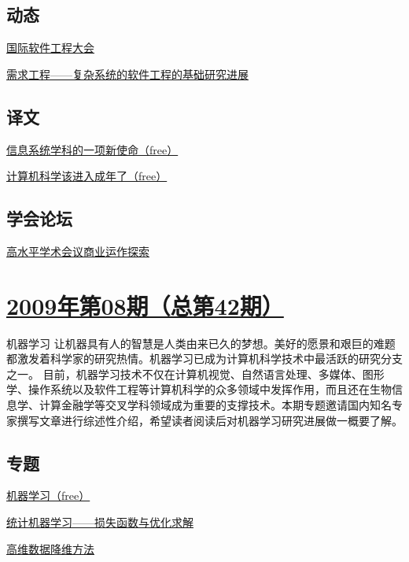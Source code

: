 \documentclass[a4paper]{article}
\begin{document}
\subsection{动态}
\href{http://history.ccf.org.cn/resources/1190201776262/2010/04/15/043068.pdf}{国际软件工程大会}

\href{http://history.ccf.org.cn/resources/1190201776262/2010/04/15/043062.pdf}{需求工程——复杂系统的软件工程的基础研究进展}

\subsection{译文}
\href{http://history.ccf.org.cn/resources/1190201776262/2010/04/15/043070.pdf}{信息系统学科的一项新使命（free）}

\href{http://history.ccf.org.cn/resources/1190201776262/2010/04/15/043073.pdf}{计算机科学该进入成年了（free）}

\subsection{学会论坛}
\href{http://history.ccf.org.cn/resources/1190201776262/2010/04/15/043092.pdf}{高水平学术会议商业运作探索}


\section{\href{http://history.ccf.org.cn/sites/ccf/jsjtbbd.jsp?contentId=2542567629043}{\textbf{2009年第08期（总第42期）}}}
机器学习 让机器具有人的智慧是人类由来已久的梦想。美好的愿景和艰巨的难题都激发着科学家的研究热情。机器学习已成为计算机科学技术中最活跃的研究分支之一。 目前，机器学习技术不仅在计算机视觉、自然语言处理、多媒体、图形学、操作系统以及软件工程等计算机科学的众多领域中发挥作用，而且还在生物信息学、计算金融学等交叉学科领域成为重要的支撑技术。本期专题邀请国内知名专家撰写文章进行综述性介绍，希望读者阅读后对机器学习研究进展做一概要了解。
\subsection{专题}
\href{http://history.ccf.org.cn/resources/1190201776262/2010/04/15/042006.pdf}{机器学习（free）}

\href{http://history.ccf.org.cn/resources/1190201776262/2010/04/15/042007.pdf}{统计机器学习——损失函数与优化求解}

\href{http://history.ccf.org.cn/resources/1190201776262/2010/04/15/042015.pdf}{高维数据降维方法}
\end{document}
